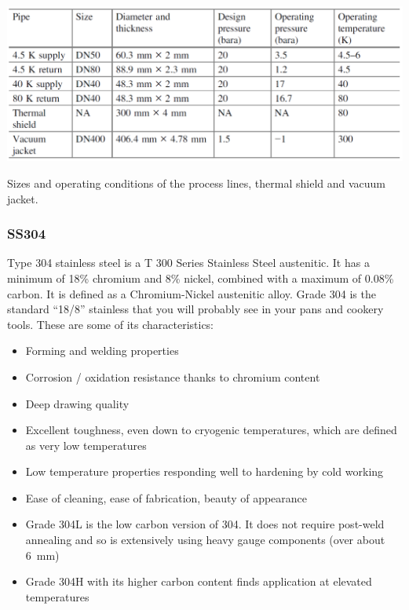 \begin{table}[H]
    \centering
    \includegraphics[width = \textwidth]{img/figure69.png}
    \caption{Sizes and operating conditions of the process lines, thermal shield and vacuum jacket.}
\end{table}
\subsubsection{SS304}
Type 304 stainless steel is a T 300 Series Stainless Steel austenitic. It has a minimum of 18\% chromium and 8\% nickel, combined with a maximum of 0.08\% carbon. It is defined as a Chromium-Nickel austenitic alloy. Grade 304 is the standard ``18/8'' stainless that you will probably see in your pans and cookery tools. These are some of its characteristics:
\begin{itemize}
    \item Forming and welding properties
    \item Corrosion / oxidation resistance thanks to chromium content
    \item Deep drawing quality
    \item Excellent toughness, even down to cryogenic temperatures, which are defined as very low temperatures
    \item Low temperature properties responding well to hardening by cold working
    \item Ease of cleaning, ease of fabrication, beauty of appearance
    \item Grade 304L is the low carbon version of 304. It does not require post-weld annealing and so is extensively using heavy gauge components (over about \SI{6}{\milli\meter})
    \item Grade 304H with its higher carbon content finds application at elevated temperatures
\end{itemize}